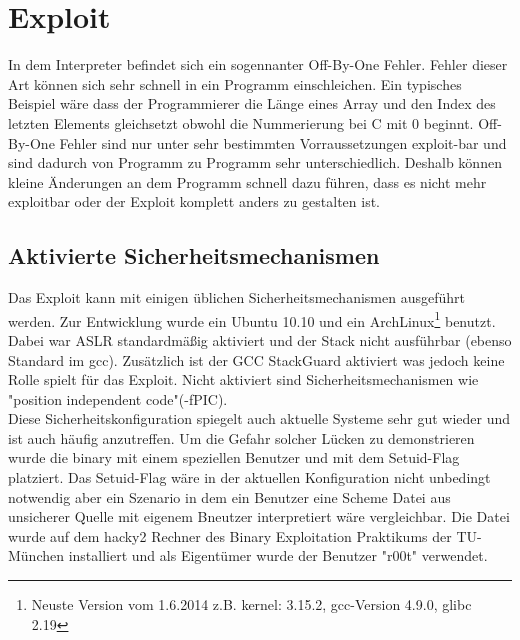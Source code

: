\section{Exploit}
In dem Interpreter befindet sich ein sogennanter Off-By-One Fehler. Fehler dieser Art können sich sehr schnell in ein Programm einschleichen. Ein typisches Beispiel wäre dass der Programmierer die Länge eines Array und den Index des letzten Elements gleichsetzt obwohl die Nummerierung bei C mit 0 beginnt. Off-By-One Fehler sind nur unter sehr bestimmten Vorraussetzungen exploit-bar und sind dadurch von Programm zu Programm sehr unterschiedlich. Deshalb können kleine Änderungen an dem Programm schnell dazu führen, dass es nicht mehr exploitbar oder der Exploit komplett anders zu gestalten ist.
\subsection{Aktivierte Sicherheitsmechanismen}
Das Exploit kann mit einigen üblichen Sicherheitsmechanismen ausgeführt werden. Zur Entwicklung wurde ein Ubuntu 10.10 und ein ArchLinux\footnote{Neuste Version vom 1.6.2014 z.B. kernel: 3.15.2, gcc-Version 4.9.0, glibc 2.19} benutzt. Dabei war ASLR standardmäßig aktiviert und der Stack nicht ausführbar (ebenso Standard im gcc). Zusätzlich ist der GCC StackGuard aktiviert was jedoch keine Rolle spielt für das Exploit. Nicht aktiviert sind Sicherheitsmechanismen wie "position independent code"(-fPIC).
\\
Diese Sicherheitskonfiguration spiegelt auch aktuelle Systeme sehr gut wieder und ist auch häufig anzutreffen. Um die Gefahr solcher Lücken zu demonstrieren wurde die binary mit einem speziellen Benutzer und mit dem Setuid-Flag platziert. Das Setuid-Flag wäre in der aktuellen Konfiguration nicht unbedingt notwendig aber ein Szenario in dem ein Benutzer eine Scheme Datei aus unsicherer Quelle mit eigenem Bneutzer interpretiert wäre vergleichbar. Die Datei wurde auf dem hacky2 Rechner des Binary Exploitation Praktikums der TU-München installiert und als Eigentümer wurde der Benutzer "r00t" verwendet.

